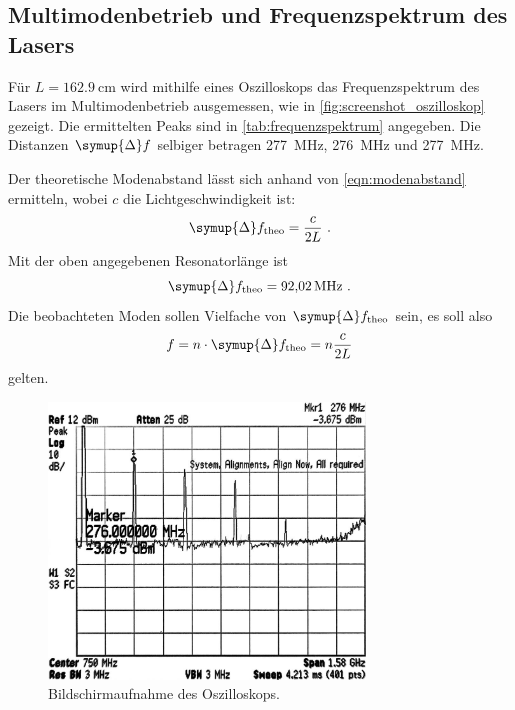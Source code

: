 \subsection{Multimodenbetrieb und Frequenzspektrum des Lasers}
\label{sec:auswertung:frequenzspektrum}
Für $L = \SI{162.9}{\centi\meter}$ wird mithilfe eines Oszilloskops das Frequenzspektrum des Lasers im Multimodenbetrieb ausgemessen,
wie in \autoref{fig:screenshot_oszilloskop} gezeigt.
Die ermittelten Peaks sind in \autoref{tab:frequenzspektrum} angegeben.
Die Distanzen $\symup{\Delta}f$ selbiger betragen
\SI{277}{\mega\hertz},
\SI{276}{\mega\hertz} und
\SI{277}{\mega\hertz}.

Der theoretische Modenabstand lässt sich anhand von \autoref{eqn:modenabstand} ermitteln,
wobei $c$ die Lichtgeschwindigkeit ist:
\begin{equation}
  \symup{\Delta}f_\text{theo} = \frac{c}{2L} \ .
  \label{eqn:modenabstand}
\end{equation}
Mit der oben angegebenen Resonatorlänge ist
\[
  \symup{\Delta}f_\text{theo} = \SI{92.02}{\mega\hertz} \ .
\]
Die beobachteten Moden sollen Vielfache von $\symup{\Delta}f_\text{theo}$ sein,
es soll also
\[
  f = n \cdot \symup{\Delta}f_\text{theo} = n\frac{c}{2L}
\]
gelten.


\begin{figure}
  \centering
   \includegraphics[width=0.75\textwidth]{content/img/5_frequenzspektrum_oszilloskop_inverted.jpg}
   \caption{Bildschirmaufnahme des Oszilloskops.}
   \label{fig:screenshot_oszilloskop}
\end{figure}

